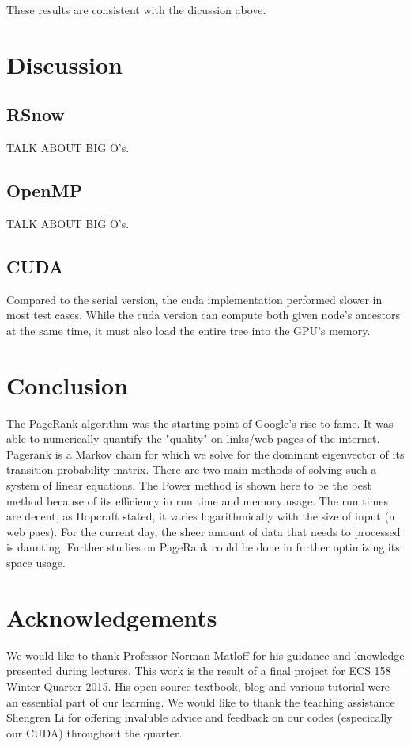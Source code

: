 \documentclass[11pt,letterpaper]{article}
\begin{document}
These results are consistent with the dicussion above. 

\section{Discussion}

\subsection{RSnow}
TALK ABOUT BIG O's.\\

\subsection{OpenMP}
TALK ABOUT BIG O's.\\

\subsection{CUDA}

Compared to the serial version, the cuda implementation performed slower in most test cases. While the cuda version can compute both given node’s ancestors at the same time, it must also load the entire tree into the GPU’s memory.\\

\section{Conclusion}

The PageRank algorithm was the starting point of Google's rise to fame. It was able to numerically quantify the "quality" on links/web pages of the internet. Pagerank is a Markov chain for which we solve for the dominant eigenvector of its transition probability matrix. There are two main methods of solving such a system of linear equations. The Power method is shown here to be the best method because of its efficiency in run time and memory usage. The run times are decent, as Hopcraft stated, it varies logarithmically with the size of input (n web paes). For the current day, the sheer amount of data that needs to processed is daunting. Further studies on PageRank could be done in further optimizing its space usage. 

\section{Acknowledgements}
We would like to thank Professor Norman Matloff for his guidance and knowledge presented during lectures. This work is the result of a final project for ECS 158 Winter Quarter 2015.  His open-source textbook, blog and various tutorial were an essential part of our learning. We would like to thank the teaching assistance Shengren Li for offering invaluble advice and feedback on our codes (especically our CUDA) throughout the quarter.
\end{document}
